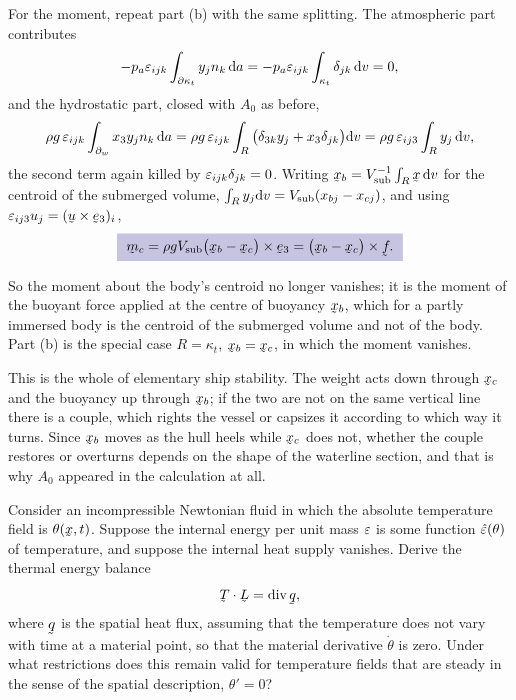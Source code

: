 \begin{solution}
For the moment, repeat part (b) with the same splitting. The
atmospheric part contributes
\[
   -p_{a}\varepsilon_{ijk}\int_{\partial\kappa_{t}}y_{j}n_{k}\,\mathrm{d} a
   =-p_{a}\varepsilon_{ijk}\int_{\kappa_{t}}\delta_{jk}\,\mathrm{d} v=0 ,
\]
and the hydrostatic part, closed with $A_{0}$ as before,
\[
   \rho g\,\varepsilon_{ijk}\int_{\partial_{w}}x_{3}y_{j}n_{k}\,\mathrm{d} a
   =\rho g\,\varepsilon_{ijk}\int_{R}\big(\delta_{3k}y_{j}+x_{3}\delta_{jk}\big)\mathrm{d} v
   =\rho g\,\varepsilon_{ij3}\int_{R}y_{j}\,\mathrm{d} v ,
\]
the second term again killed by $\varepsilon_{ijk}\delta_{jk}=0$. Writing
$\bx_{b}=V_{\text{sub}}^{-1}\int_{R}\bx\,\dl v$ for the centroid of the
submerged volume,
$\int_{R}y_{j}\mathrm{d} v=V_{\text{sub}}(x_{bj}-x_{cj})$, and using
$\eps_{ij3}u_{j}=(\bu\times\be_{3})_{i}$,
\[
   \boxed{\ \bmm_{c}=\rho gV_{\text{sub}}
   \big(\bx_{b}-\bx_{c}\big)\times\be_{3}
   =\big(\bx_{b}-\bx_{c}\big)\times\bff . \ }
\]

So the moment about the body's centroid no longer vanishes; it is the
moment of the buoyant force applied at the centre of buoyancy $\bx_{b}$,
which for a partly immersed body is the centroid of the submerged
volume and not of the body. Part (b) is the special case $R=\kappa_{t}$,
$\bx_{b}=\bx_{c}$, in which the moment vanishes.

This is the whole of elementary ship stability. The weight acts down
through $\bx_{c}$ and the buoyancy up through $\bx_{b}$; if the two are
not on the same vertical line there is a couple, which rights the vessel
or capsizes it according to which way it turns. Since $\bx_{b}$ moves as
the hull heels while $\bx_{c}$ does not, whether the couple restores or
overturns depends on the shape of the waterline section, and that is why
$A_{0}$ appeared in the calculation at all.
\end{solution}
\begin{problem}
Consider an incompressible Newtonian fluid in which the absolute
temperature field is $\theta(\bx,t)$. Suppose the internal energy per
unit mass $\varepsilon$ is some function $\hat{\varepsilon}(\theta)$ of temperature, and
suppose the internal heat supply vanishes. Derive the thermal energy
balance
\[
   \ip\bT\bL=\dvg\bq ,
\]
where $\bq$ is the spatial heat flux, assuming that the temperature does
not vary with time at a material point, so that the material derivative
$\dot\theta$ is zero. Under what restrictions does this remain valid for
temperature fields that are steady in the sense of the spatial
description, $\theta'=0$?
\end{problem}

